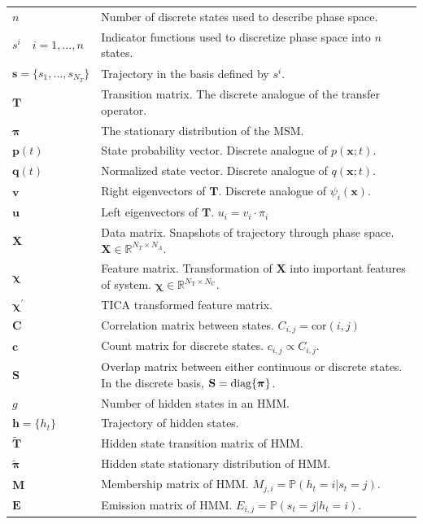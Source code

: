 \begin{table}
\begin{tabularx}{0.9\textwidth}{ |l| >{\raggedright\arraybackslash}X | }
        $n$ & Number of discrete states used to describe phase space.\\
        $s^{i}\quad i = 1, \ldots, n$ & Indicator functions used to discretize phase space into $n$ states.  \\
        $\mathbf{s} = \{s_{1}, \ldots, s_{N_{T}}\} $ & Trajectory in the basis defined by $s^{i}$. \\
        $\mathbf{T}$ & Transition matrix. The discrete analogue of the transfer operator. \\
        $\bm{\pi}$ & The stationary distribution of the MSM. \\
        $\mathbf{p}(t)$ & State probability vector. Discrete analogue of $p(\mathbf{x}; t)$. \\
        $\mathbf{q}(t)$ & Normalized state vector. Discrete analogue of $q(\mathbf{x};t)$. \\
        $\mathbf{v}$ & Right eigenvectors of $\mathbf{T}$. Discrete analogue of $\psi_{i}(\mathbf{x})$. \\
        $\mathbf{u}$ & Left eigenvectors of $\mathbf{T}$. $u_{i} = v_{i}\cdot\pi_{i}$ \\
        $\mathbf{X}$ & Data matrix. Snapshots of trajectory through phase space. $\mathbf{X}\in \mathbb{R}^{N_{T}\times N_{A}}$.\\
        $\bm{\chi}$ & Feature matrix. Transformation of $\mathbf{X}$ into important features of system. $\bm{\chi} \in \mathbb{R}^{N_{\mathrm{T}}\times N_{\mathrm{C}}}$. \\
        $\bm{\chi}^{\prime}$ & TICA transformed feature matrix. \\
        $\mathbf{C}$ & Correlation matrix between states. $C_{i,j} = \mathrm{cor}(i, j)$  \\
        $\mathbf{c}$ & Count matrix for discrete states. $c_{i,j} \propto C_{i,j}$. \\
        $\mathbf{S}$ & Overlap matrix between  either continuous or discrete states. In the discrete basis, $\mathbf{S} = \textnormal{diag} \{\bm{\pi}\}$. \\
        $g$ & Number of hidden states in an HMM. \\
        $\mathbf{h} = \{h_t\}$ & Trajectory of hidden states. \\
        $\widetilde{\mathbf{T}}$ & Hidden state transition matrix of HMM. \\
        $\widetilde{\bm{\pi}}$ & Hidden state stationary distribution of HMM. \\
        $\mathbf{M}$ & Membership matrix of HMM. $M_{j,i} = \mathbb{P}(h_t=i|s_t=j)$. \\
        $\mathbf{E}$ & Emission matrix of HMM. $E_{i, j}= \mathbb{P}(s_t=j|h_t=i)$. \\
     \hline
     \end{tabularx}
    \label{tab:theory_symbols}
\end{table}

